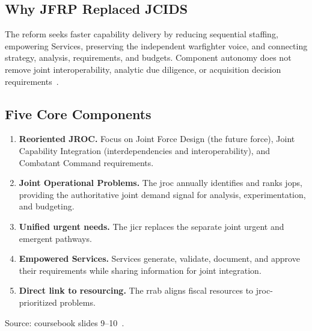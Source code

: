 \documentclass[../main.tex]{subfiles}
\begin{document}
\subsection{Why JFRP Replaced JCIDS}
The reform seeks faster capability delivery by reducing sequential staffing, empowering Services, preserving the independent warfighter voice, and connecting strategy, analysis, requirements, and budgets. Component autonomy does not remove joint interoperability, analytic due diligence, or acquisition decision requirements~\autocite[slides 7--10, 33--35]{edo-3-3-3-jfrp-2026}.

\subsection{Five Core Components}
\begin{enumerate}
  \item \textbf{Reoriented JROC.} Focus on Joint Force Design (the future force), Joint Capability Integration (interdependencies and interoperability), and Combatant Command requirements.
  \item \textbf{Joint Operational Problems.} The \ac{jroc} annually identifies and ranks \acp{jop}, providing the authoritative joint demand signal for analysis, experimentation, and budgeting.
  \item \textbf{Unified urgent needs.} The \ac{jicr} replaces the separate joint urgent and emergent pathways.
  \item \textbf{Empowered Services.} Services generate, validate, document, and approve their requirements while sharing information for joint integration.
  \item \textbf{Direct link to resourcing.} The \ac{rrab} aligns fiscal resources to \ac{jroc}-prioritized problems.
\end{enumerate}
\noindent Source: coursebook slides 9--10~\autocite{edo-3-3-3-jfrp-2026}.
\end{document}
